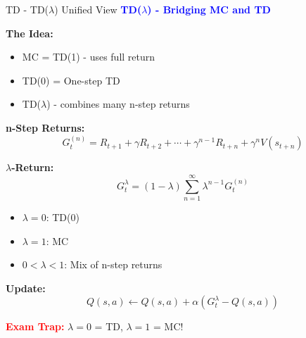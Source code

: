 \documentclass[8pt]{beamer}
\begin{document}
	\begin{frame}{TD - TD($\lambda$) Unified View}
		\fontsize{6.5}{7.5}\selectfont
		\textcolor{blue}{\textbf{TD($\lambda$) - Bridging MC and TD}}
		
		\textbf{The Idea:}
		\begin{itemize}
			\item MC = TD(1) - uses full return
			\item TD(0) = One-step TD
			\item TD($\lambda$) - combines many n-step returns
		\end{itemize}
		
		\textbf{n-Step Returns:}
		\[
		G_t^{(n)} = R_{t+1} + \gamma R_{t+2} + \cdots + \gamma^{n-1}R_{t+n} + \gamma^n V(s_{t+n})
		\]
		
		\textbf{$\lambda$-Return:}
		\[
		G_t^\lambda = (1-\lambda)\sum_{n=1}^{\infty} \lambda^{n-1} G_t^{(n)}
		\]
		\begin{itemize}
			\item $\lambda = 0$: TD(0)
			\item $\lambda = 1$: MC
			\item $0 < \lambda < 1$: Mix of n-step returns
		\end{itemize}
		
		\textbf{Update:}
		\[
		Q(s,a) \leftarrow Q(s,a) + \alpha(G_t^\lambda - Q(s,a))
		\]
		
		\textcolor{red}{\textbf{Exam Trap:}} $\lambda=0$ = TD, $\lambda=1$ = MC!
	\end{frame}
	
\end{document}
